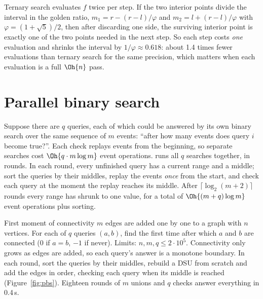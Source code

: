 \begin{trick}
Ternary search evaluates $f$ twice per step. If the two interior points divide the interval in the golden ratio,
$m_1 = r - (r - l)/\varphi$ and $m_2 = l + (r - l)/\varphi$ with $\varphi = (1 + \sqrt 5)/2$, then after discarding one
side, the surviving interior point is exactly one of the two points needed in the next step. So each step costs \emph{one}
evaluation and shrinks the interval by $1/\varphi \approx 0.618$: about 1.4 times fewer evaluations than ternary search for the
same precision, which matters when each evaluation is a full $\Oh{n}$ pass.
\end{trick}

\section[Parallel binary search]{Parallel binary search \hfill \ioi}\label{sec:parallel-bs}

Suppose there are $q$ queries, each of which could be answered by its own binary search over the same sequence of $m$ events:
``after how many events does query $i$ become true?''. Each check replays events from the beginning, so separate searches cost
$\Oh{q \cdot m \log m}$ event operations.  runs all $q$ searches together, in rounds. In each
round, every unfinished query has a current range and a middle; sort the queries by their middles, replay the events
\emph{once} from the start, and check each query at the moment the replay reaches its middle. After $\lceil \log_2 (m + 2)
\rceil$ rounds every range has shrunk to one value, for a total of $\Oh{(m + q)\log m}$ event operations plus sorting.

\begin{problem}{First moment of connectivity}
$m$ edges are added one by one to a graph with $n$ vertices. For each of $q$ queries $(a, b)$, find the first time after which
$a$ and $b$ are connected (0 if $a = b$, $-1$ if never). Limits: $n, m, q \le 2\cdot10^5$.
\solution Connectivity only grows as edges are added, so each query's answer is a monotone boundary. In each round, sort the
queries by their middles, rebuild a DSU from scratch and add the edges in order, checking each query when its middle is
reached (Figure~\ref{fig:pbs}). Eighteen rounds of $m$ unions and $q$ checks answer everything in 0.4\,s.
\end{problem}

